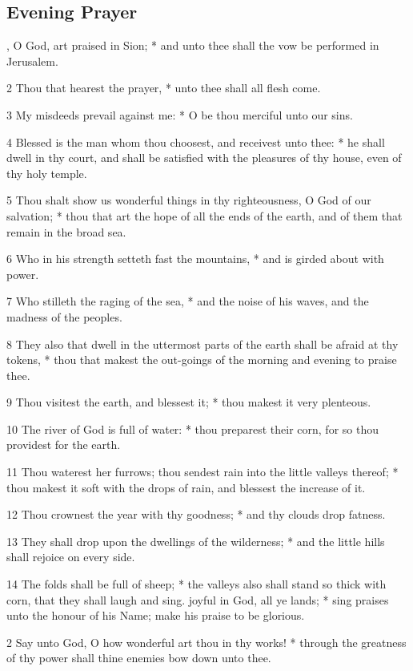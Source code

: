 \subsection{Evening Prayer}
, O God, art praised in Sion; * and unto thee shall the vow be performed in Jerusalem.\par
2 Thou that hearest the prayer, * unto thee shall all flesh come.\par
3 My misdeeds prevail against me: * O be thou merciful unto our sins.\par
4 Blessed is the man whom thou choosest, and receivest unto thee: * he shall dwell in thy court, and shall be satisfied with the pleasures of thy house, even of thy holy temple.\par
5 Thou shalt show us wonderful things in thy righteousness, O God of our salvation; * thou that art the hope of all the ends of the earth, and of them that remain in the broad sea.\par
6 Who in his strength setteth fast the mountains, * and is girded about with power.\par
7 Who stilleth the raging of the sea, * and the noise of his waves, and the madness of the peoples.\par
8 They also that dwell in the uttermost parts of the earth shall be afraid at thy tokens, * thou that makest the out-goings of the morning and evening to praise thee.\par
9 Thou visitest the earth, and blessest it; * thou makest it very plenteous.\par
10 The river of God is full of water: * thou preparest their corn, for so thou providest for the earth.\par
11 Thou waterest her furrows; thou sendest rain into the little valleys thereof; * thou makest it soft with the drops of rain, and blessest the increase of it.\par
12 Thou crownest the year with thy goodness; * and thy clouds drop fatness.\par
13 They shall drop upon the dwellings of the wilderness; * and the little hills shall rejoice on every side.\par
14 The folds shall be full of sheep; * the valleys also shall stand so thick with corn, that they shall laugh and sing.
 joyful in God, all ye lands; * sing praises unto the honour of his Name; make his praise to be glorious.\par
2 Say unto God, O how wonderful art thou in thy works! * through the greatness of thy power shall thine enemies bow down unto thee.\par
